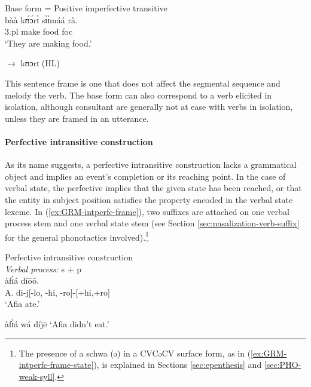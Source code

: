 \begin{exe}
\begin{exe}
\begin{exe}
{\begin{exe}
\begin{exe}
\begin{exe}
\begin{exe}
\begin{exe}
\begin{exe}
\begin{exe}
\begin{exe}
\begin{exe}
\begin{exe}
\begin{exe}
\begin{exe}
\begin{exe}
\begin{exe}
\begin{exe}
\begin{exe}
\begin{exe}
\begin{exe}
\begin{exe}
\ea\label{ex:GRM-base-form}{\rm  Base form = Positive imperfective transitive}\\
\gll   bàà kʊ́ɔ́rɪ̀ sɪ̀ɪ̀máá rà.\\
3.{\sc pl}  make food {\sc foc}\\
\glt `They are making food.'\\\par
$\rightarrow$ {\rm kʊɔrɪ  (HL)}
 \z

 This sentence frame is one that does not affect the segmental sequence and 
melody the verb. The base form can also correspond  to a  verb elicited in 
isolation, although consultant are generally not at ease with verbs in 
isolation, unless they are framed in an utterance.

\paragraph{Perfective intransitive construction}
\label{sec:GRM-verb-perf-intran}

As its name suggests, a  perfective 
intransitive construction  lacks a 
grammatical
object and implies an event's completion or its 
reaching point.  In the case of verbal state,
the  perfective  implies that the given state has been reached, 
or 
that the entity in subject position   satisfies the property encoded in
the verbal state lexeme. In 
(\ref{ex:GRM-intperfc-frame}),  two suffixes 
are
attached on  one verbal process stem and one  verbal state 
stem (see Section \ref{sec:nasalization-verb-suffix}
for the general phonotactics involved).\footnote{The presence of  a schwa
({\sls ə}) in a CVCəCV surface form, as in (\ref{ex:GRM-intperfc-frame-state}), 
is explained in Sections \ref{sec:epenthesis} and \ref{sec:PHO-weak-syll}.}


\ea\label{ex:GRM-intperfc-frame}{\rm Perfective intransitive construction}\\


\ea\label{ex:GRM-intperfc-frame-process}{{\it  Verbal process:} {\sc s}  $+$
{\sc p} }\\
\gll àfɪ̀á díōō.\\
A. {di-j[{\sc -lo, -hi, -ro}]-[{\sc +hi,+ro}]}\\

\glt `Afia ate.'

\ex  àfɪ̀á wá díjē   {\rm `Afia didn't eat.'}


\end{exe}
\end{exe}
\end{exe}
\end{exe}
\end{exe}
\end{exe}
\end{exe}
\end{exe}
\end{exe}
\end{exe}
\end{exe}
\end{exe}
\end{exe}
\end{exe}
\end{exe}
\end{exe}
\end{exe}
\end{exe}
\end{exe}}
\end{exe}
\end{exe}
\end{exe}
